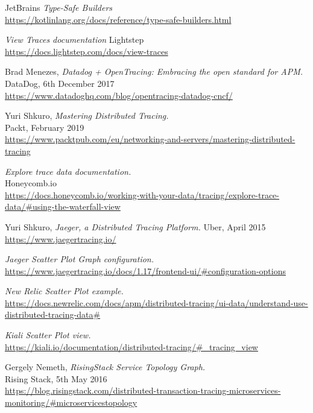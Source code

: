 \documentclass[12pt,pdftex,titlepage]{report}
\begin{document}
\begin{thebibliography}{69}
        JetBrains \textit{Type-Safe Builders} \\
        \url{https://kotlinlang.org/docs/reference/type-safe-builders.html}

        \textit{View Traces documentation}
        Lightstep \\ 
        \url{https://docs.lightstep.com/docs/view-traces}

        Brad Menezes, \textit{Datadog + OpenTracing: Embracing the open standard for APM.} \\
        DataDog, 6th December 2017 \\
        \url{https://www.datadoghq.com/blog/opentracing-datadog-cncf/}

        Yuri Shkuro, \textit{Mastering Distributed Tracing.} \\
        Packt, February 2019 \\
        \url{https://www.packtpub.com/eu/networking-and-servers/mastering-distributed-tracing}

        \textit{Explore trace data documentation.} \\
        Honeycomb.io \\
        \url{https://docs.honeycomb.io/working-with-your-data/tracing/explore-trace-data/#using-the-waterfall-view}

        Yuri Shkuro, \textit{Jaeger, a Distributed Tracing Platform.}
        Uber, April 2015 \\
        \url{https://www.jaegertracing.io/}

        \textit{Jaeger Scatter Plot Graph configuration.} \\
        \url{https://www.jaegertracing.io/docs/1.17/frontend-ui/#configuration-options}

        \textit{New Relic Scatter Plot example.} \\
        \url{https://docs.newrelic.com/docs/apm/distributed-tracing/ui-data/understand-use-distributed-tracing-data#}

        \textit{Kiali Scatter Plot view.} \\
        \url{https://kiali.io/documentation/distributed-tracing/#_tracing_view}

        Gergely Nemeth, \textit{RisingStack Service Topology Graph.} \\
        Rising Stack, 5th May 2016 \\
        \url{https://blog.risingstack.com/distributed-transaction-tracing-microservices-monitoring/#microservicestopology}


\end{thebibliography}
\end{document}
